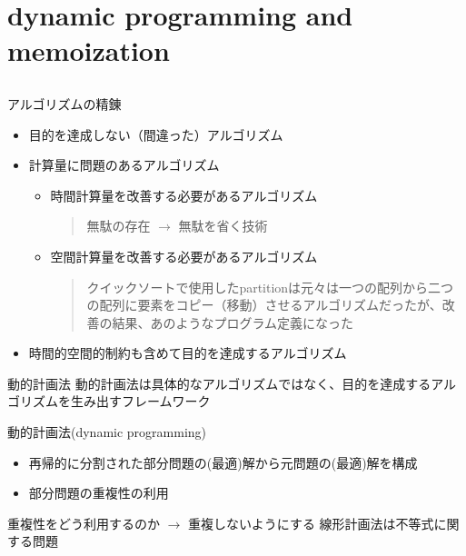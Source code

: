\documentclass{beamer}
\subtitle{動的計画法}
\begin{document}
\begin{frame}[fragile]{}
\titlepage
\end{frame}

\section{dynamic programming and memoization}		%
\subsection{}

\begin{frame}[fragile]{アルゴリズムの精錬}{}
\begin{itemize}\itemsep10pt
\item 目的を達成しない（間違った）アルゴリズム
\item 計算量に問題のあるアルゴリズム
\begin{itemize}\itemsep8pt
\item 時間計算量を改善する必要があるアルゴリズム
\begin{quote}
無駄の存在 $\to$ 無駄を省く技術
\end{quote}
\item 空間計算量を改善する必要があるアルゴリズム
\begin{quote}
クイックソートで使用したpartitionは元々は一つの配列から二つの配列に要素をコピー（移動）させるアルゴリズムだったが、改善の結果、あのようなプログラム定義になった
\end{quote}
\end{itemize}
\item 時間的空間的制約も含めて目的を達成するアルゴリズム
\end{itemize}
\end{frame}

\begin{frame}[fragile]{動的計画法}{}
動的計画法は具体的なアルゴリズムではなく、目的を達成するアルゴリズムを生み出すフレームワーク
\vfill
\begin{block}{動的計画法(dynamic programming)}
\begin{itemize}%
\item 再帰的に分割された部分問題の(最適)解から元問題の(最適)解を構成
\item 部分問題の重複性の利用
\end{itemize}
\end{block}
\vfill
重複性をどう利用するのか $\to$ 重複しないようにする
\vfill
{\fontsize{8}{9}\selectfont 線形計画法は不等式に関する問題}
\end{frame}
\end{document}
